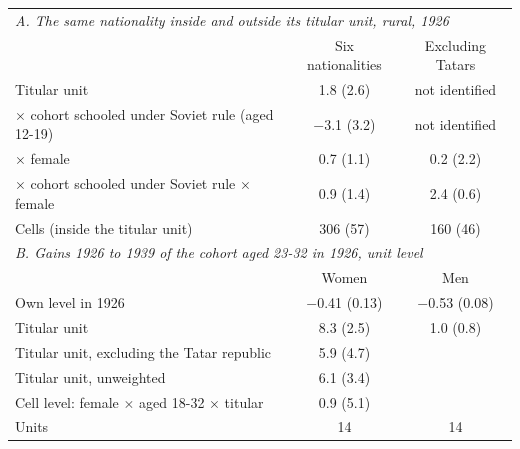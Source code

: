 \begin{tabular}{lcc}
\toprule
\multicolumn{3}{l}{\textit{A. The same nationality inside and outside its titular unit, rural, 1926}} \\
 & Six nationalities & Excluding Tatars \\
\midrule
Titular unit & 1.8 (2.6) & not identified \\
$\times$ cohort schooled under Soviet rule (aged 12-19) & $-$3.1 (3.2) & not identified \\
$\times$ female & 0.7 (1.1) & 0.2 (2.2) \\
$\times$ cohort schooled under Soviet rule $\times$ female & 0.9 (1.4) & 2.4 (0.6) \\
Cells (inside the titular unit) & 306 (57) & 160 (46) \\
\midrule
\multicolumn{3}{l}{\textit{B. Gains 1926 to 1939 of the cohort aged 23-32 in 1926, unit level}} \\
 & Women & Men \\
\midrule
Own level in 1926 & $-$0.41 (0.13) & $-$0.53 (0.08) \\
Titular unit & 8.3 (2.5) & 1.0 (0.8) \\
Titular unit, excluding the Tatar republic & 5.9 (4.7) & \\
Titular unit, unweighted & 6.1 (3.4) & \\
Cell level: female $\times$ aged 18-32 $\times$ titular & 0.9 (5.1) & \\
Units & 14 & 14 \\
\bottomrule
\end{tabular}
